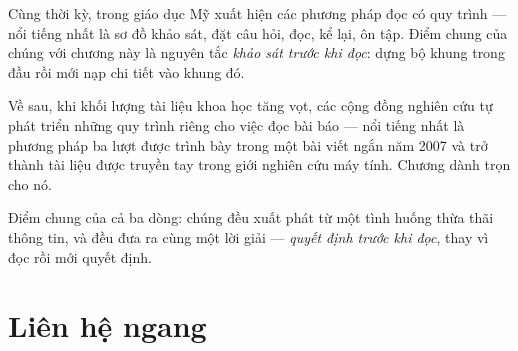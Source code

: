 \documentclass[../../english.tex]{subfiles}
\begin{document}
Cùng thời kỳ, trong giáo dục Mỹ xuất hiện các phương pháp đọc có quy trình --- nổi tiếng nhất là sơ đồ khảo sát, đặt câu hỏi, đọc, kể lại, ôn tập. Điểm chung của chúng với chương này là nguyên tắc \emph{khảo sát trước khi đọc}: dựng bộ khung trong đầu rồi mới nạp chi tiết vào khung đó.

Về sau, khi khối lượng tài liệu khoa học tăng vọt, các cộng đồng nghiên cứu tự phát triển những quy trình riêng cho việc đọc bài báo --- nổi tiếng nhất là phương pháp ba lượt được trình bày trong một bài viết ngắn năm 2007 và trở thành tài liệu được truyền tay trong giới nghiên cứu máy tính\cite{keshav2007}. Chương  dành trọn cho nó.

Điểm chung của cả ba dòng: chúng đều xuất phát từ một tình huống thừa thãi thông tin, và đều đưa ra cùng một lời giải --- \emph{quyết định trước khi đọc}, thay vì đọc rồi mới quyết định.

\begin{gocre}
\end{gocre}

\section{Liên hệ ngang}
\end{document}
